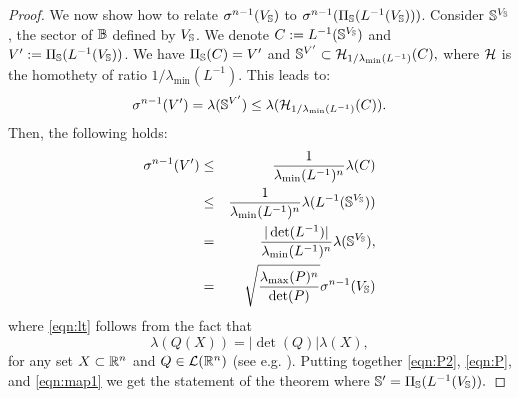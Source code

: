 \begin{proof}

We now show how to relate $\sigma^{n-1}(V_{\mathbb{S}})$ to $\sigma^{n-1}(\Pi_{\mathbb{S}}(L^{-1}(V_{\mathbb{S}})))$. Consider $\mathbb{S}^{V_{\mathbb{S}}}$, the sector of $\mathbb{B}$ defined by $V_{\mathbb{S}}$. We denote $C:= L^{-1}(\mathbb{S}^{V_{\mathbb{S}}})$ and $V':=\Pi_{\mathbb{S}}(L^{-1}(V_{\mathbb{S}}))$. We have $\Pi_{\mathbb{S}}(C) = V'$ and $\mathbb{S}^{V'} \subset \mathcal{H}_{1/ \lambda_{\min}(L^{-1})}(C),$
where $\mathcal{H}$ is the homothety of ratio $1/ \lambda_{\min}(L^{-1})$. This leads to:
$$\sigma^{n-1}(V') = \lambda(\mathbb{S}^{V'}) \leq \lambda (\mathcal{H}_{1/ \lambda_{\min}(L^{-1})}(C)).$$ Then, the following holds: \begin{eqnarray}\nonumber\sigma^{n-1}(V') &\leq& \frac{1}{\lambda_{\min}(L^{-1})^n}\lambda(C) \\
\nonumber &\leq&\frac{1}{\lambda_{\min}(L^{-1})^n} \lambda( L^{-1}(\mathbb{S}^{V_{\mathbb{S}}}))\\ 
\label{eqn:lt} &=&\frac{|\det(L^{-1})|}{\lambda_{\min}(L^{-1})^n}\lambda(\mathbb{S}^{V_{\mathbb{S}}}),\\
 \label{eqn:map1} &=&\sqrt{\frac{\lambda_{\max}(P)^n}{\det(P)}}\sigma^{n-1}(V_{\mathbb{S}})
\end{eqnarray}
where \eqref{eqn:lt} follows from the fact that
$$ \lambda(Q(X)) = |\det(Q)| \lambda(X),$$
for any set $X \subset \mathbb{R}^n$ and $Q \in \mathcal{L}(\mathbb{R}^n)$ (see e.g. \cite{rudin}).
Putting together \eqref{eqn:P2}, \eqref{eqn:P}, and \eqref{eqn:map1} we get the statement of the theorem where $\mathbb{S}' = \Pi_{\mathbb{S}}(L^{-1}(V_{\mathbb{S}})).$
\end{proof}

